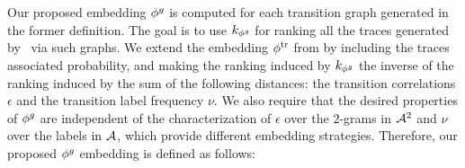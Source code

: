 {Our proposed embedding ${\phi^{g}}$ is computed for each transition graph generated in the former definition. The goal is to use
$k_{{\phi^{g}}}$ for ranking all the traces generated by \unravelling\ via such graphs. We extend the embedding ${\phi^{\text{tr}}}$ from \cite{LodhiSSCW02} by including the traces associated probability, and making the ranking induced by $k_{{\phi^{g}}}$ the inverse of the ranking induced by the
sum of the following distances: the transition correlations $\epsilon$ and the transition label frequency $\nu$.}
{We also require that the desired properties of ${\phi^{g}}$ are independent of the characterization of $\epsilon$ over the $2$-grams in $\mathcal{A}^2$ and $\nu$ over the labels in $\mathcal{A}$, which  provide different embedding strategies. } Therefore, our proposed ${\phi^{g}}$ embedding is  defined  as follows:


